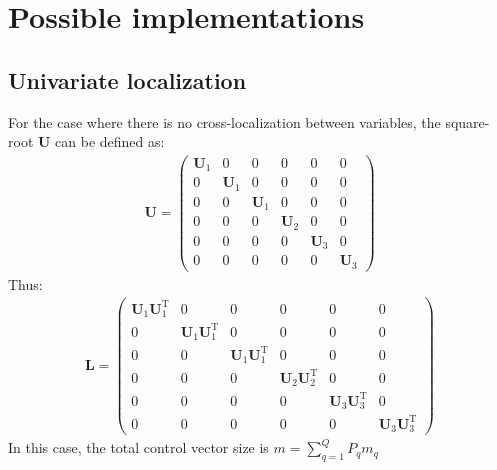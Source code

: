 \documentclass[12pt]{scrartcl}
\begin{document}
\section{Possible implementations}

\subsection{Univariate localization}
For the case where there is no cross-localization between variables, the square-root $\mathbf{U}$ can be defined as:
\begin{align}
\mathbf{U} = \left( \begin{array}{ccc|c|cc}
\mathbf{U}_1 & 0 & 0 & 0 & 0 & 0 \\
0 & \mathbf{U}_1 & 0 & 0 & 0 & 0 \\
0 & 0 & \mathbf{U}_1 & 0 & 0 & 0 \\[0.3ex]
\hline
0 & 0 & 0 & \mathbf{U}_2 & 0 & 0 \\[0.3ex]
\hline
0 & 0 & 0 & 0 & \mathbf{U}_3 & 0 \\
0 & 0 & 0 & 0 & 0 & \mathbf{U}_3
\end{array} \right)
\end{align}
Thus:
\begin{align}
\mathbf{L} = \left( \begin{array}{ccc|c|cc}
\mathbf{U}_1 \mathbf{U}_1^\mathrm{T} & 0 & 0 & 0 & 0 & 0 \\
0 & \mathbf{U}_1 \mathbf{U}_1^\mathrm{T} & 0 & 0 & 0 & 0 \\
0 & 0 & \mathbf{U}_1 \mathbf{U}_1^\mathrm{T} & 0 & 0 & 0 \\[0.3ex]
\hline
0 & 0 & 0 & \mathbf{U}_2 \mathbf{U}_2^\mathrm{T} & 0 & 0 \\[0.3ex]
\hline
0 & 0 & 0 & 0 & \mathbf{U}_3 \mathbf{U}_3^\mathrm{T} & 0 \\
0 & 0 & 0 & 0 & 0 & \mathbf{U}_3 \mathbf{U}_3^\mathrm{T}
\end{array} \right)
\end{align}
In this case, the total control vector size is $\displaystyle m = \sum_{q=1}^Q P_q m_q$
\end{document}
